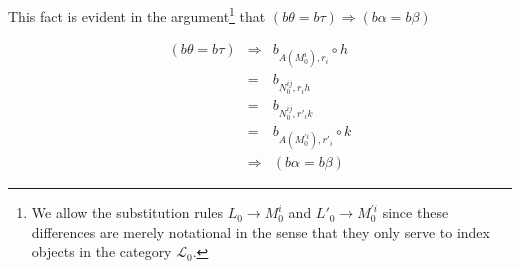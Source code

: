 \begin{frame}
This fact is evident in the argument\footnote{We allow the substitution rules $L_0 \rightarrow M_0^i$ and $L'_0 \rightarrow M_0^{'i}$ since these differences are merely notational in the sense that they only serve to index objects in the category $\mathcal{L}_0$.} that $(b \theta = b \tau) \Rightarrow (b \alpha = b \beta)$
\begin{block}{}
\abovedisplayskip=0pt
\begin{eqnarray*}
(b \theta = b \tau) &\Rightarrow & b_{A(M_0^i),r_i} \circ h \\
&=& b_{N_0^{ij},r_i h}\\
&=& b_{N_0^{ij},r'_i k}\\
&=& b_{A(M_0^{'i}),r'_i} \circ k\\
&\Rightarrow & (b \alpha = b \beta)
\end{eqnarray*}
\end{block}
\end{frame}